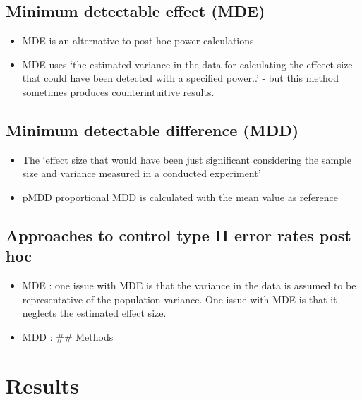 \documentclass[
]{book}
\providecommand{\tightlist}{%
  \setlength{\itemsep}{0pt}\setlength{\parskip}{0pt}}
\begin{document}
\hypertarget{minimum-detectable-effect-mde}{%
\subsection{Minimum detectable effect (MDE)}\label{minimum-detectable-effect-mde}}

\begin{itemize}
\tightlist
\item
  MDE is an alternative to post-hoc power calculations
\item
  MDE uses `the estimated variance in the data for calculating the effeect size that could have been detected with a specified power..' - but this method sometimes produces counterintuitive results.
\end{itemize}

\hypertarget{minimum-detectable-difference-mdd}{%
\subsection{Minimum detectable difference (MDD)}\label{minimum-detectable-difference-mdd}}

\begin{itemize}
\tightlist
\item
  The `effect size that would have been just significant considering the sample size and variance measured in a conducted experiment'
\item
  pMDD proportional MDD is calculated with the mean value as reference
\end{itemize}

\hypertarget{approaches-to-control-type-ii-error-rates-post-hoc}{%
\subsection{Approaches to control type II error rates post hoc}\label{approaches-to-control-type-ii-error-rates-post-hoc}}

\begin{itemize}
\item
  MDE : one issue with MDE is that the variance in the data is assumed to be representative of the population variance. One issue with MDE is that it neglects the estimated effect size.
\item
  MDD :
  \#\# Methods
\end{itemize}

\hypertarget{results-13}{%
\section{Results}\label{results-13}}
\end{document}
